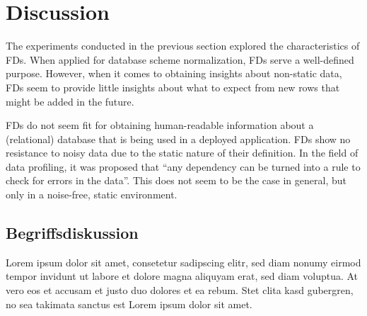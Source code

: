 \newpage
\section{Discussion}
The experiments conducted in the previous section explored the characteristics of FDs.
When applied for database scheme normalization, FDs serve a well-defined purpose.
However, when it comes to obtaining insights about non-static data, FDs seem to provide little insights about what to expect from new rows that might be added in the future.

FDs do not seem fit for obtaining human-readable information about a (relational) database that is being used in a deployed application.
FDs show no resistance to noisy data due to the static nature of their definition.
In the field of data profiling, it was proposed that ``any dependency can be turned into a rule to check for errors in the data''.\cite[p.~9]{ABE19}
This does not seem to be the case in general, but only in a noise-free, static environment.

\subsection{Begriffsdiskussion}
Lorem ipsum dolor sit amet, consetetur sadipscing elitr, sed diam nonumy eirmod
tempor invidunt ut labore et dolore magna aliquyam erat, sed diam voluptua. At
vero eos et accusam et justo duo dolores et ea rebum. Stet clita kasd gubergren,
no sea takimata sanctus est Lorem ipsum dolor sit amet.
